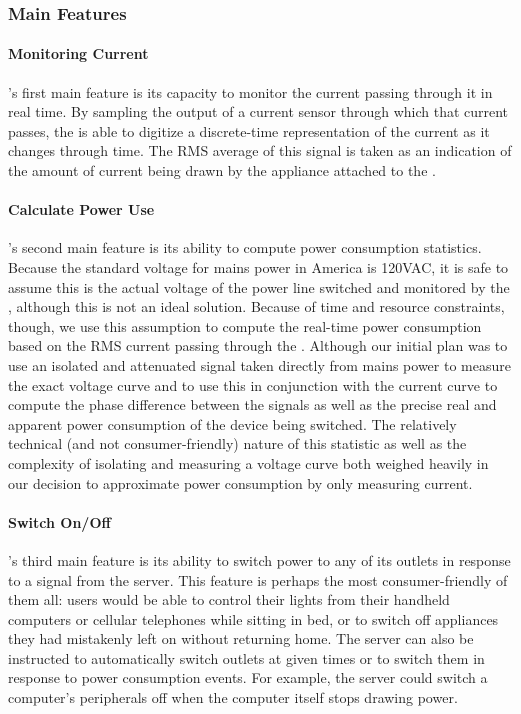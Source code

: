 \subsubsection{Main Features}

\paragraph{Monitoring Current} \netlet's first main feature is its capacity to monitor the current passing through it in real time. By sampling the output of a current sensor through which that current passes, the \atmega is able to digitize a discrete-time representation of the current as it changes through time. The RMS average of this signal is taken as an indication of the amount of current being drawn by the appliance attached to the \netlet.

\paragraph{Calculate Power Use} \netlet's second main feature is its ability to compute power consumption statistics. Because the standard voltage for mains power in America is 120VAC, it is safe to assume this is the actual voltage of the power line switched and monitored by the \netlet, although this is not an ideal solution. Because of time and resource constraints, though, we use this assumption to compute the real-time power consumption based on the RMS current passing through the \netlet. Although our initial plan was to use an isolated and attenuated signal taken directly from mains power to measure the exact voltage curve and to use this in conjunction with the current curve to compute the phase difference between the signals as well as the precise real and apparent power consumption of the device being switched. The relatively technical (and not consumer-friendly) nature of this statistic as well as the complexity of isolating and measuring a voltage curve both weighed heavily in our decision to approximate power consumption by only measuring current.

\paragraph{Switch On/Off} \netlet's third main feature is its ability to switch power to any of its outlets in response to a signal from the server. This feature is perhaps the most consumer-friendly of them all: users would be able to control their lights from their handheld computers or cellular telephones while sitting in bed, or to switch off appliances they had mistakenly left on without returning home. The server can also be instructed to automatically switch outlets at given times or to switch them in response to power consumption events. For example, the server could switch a computer's peripherals off when the computer itself stops drawing power.

